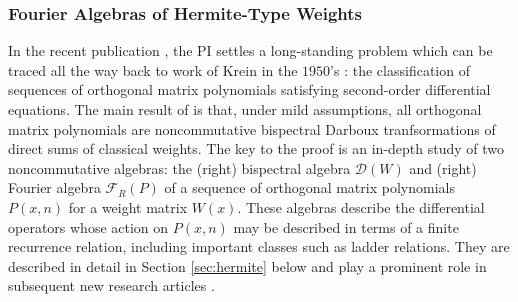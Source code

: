 \documentclass[11pt,letterpaper]{article}
\theoremstyle{definition}
\begin{document}
\subsubsection*{Fourier Algebras of Hermite-Type Weights}
In the recent publication \cite{CY2018}, the PI settles a long-standing problem which can be traced all the way back to work of Krein in the $1950$'s \cite{Krein}: the classification of sequences of orthogonal matrix polynomials satisfying second-order differential equations.  The main result of \cite{CY2018} is that, under mild assumptions, all orthogonal matrix polynomials are noncommutative bispectral Darboux tranfsormations of direct sums of classical weights.  The key to the proof is an in-depth study of two noncommutative algebras: the (right) bispectral algebra $\mathcal D(W)$ and (right) Fourier algebra $\mathcal F_R(P)$ of a sequence of orthogonal matrix polynomials $P(x,n)$ for a weight matrix $W(x)$.  These algebras describe the differential operators whose action on $P(x,n)$ may be described in terms of a finite recurrence relation, including important classes such as ladder relations.  They are described in detail in Section \ref{sec:hermite} below and play a prominent role in subsequent new research articles \cite{calderon,deano,ismail}.
\end{document}
